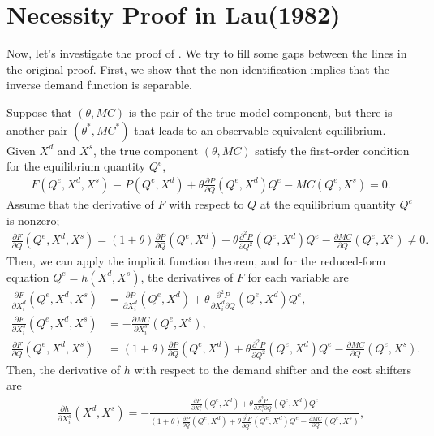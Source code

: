 \documentclass[11pt, a4paper]{article}
\theoremstyle{remark}
\begin{document}
\section{Necessity Proof in Lau(1982)}\label{sec:proof_lau_necessity}
Now, let's investigate the proof of \citet{lau1982identifying}.
We try to fill some gaps between the lines in the original proof.
First, we show that the non-identification implies that the inverse demand function is separable.

Suppose that $(\theta, MC)$ is the pair of the true model component, but there is another pair $(\theta^{*}, MC^{*})$ that leads to an observable equivalent equilibrium.
Given $X^{d}$ and $X^{s}$, the true component $(\theta, MC)$ satisfy the first-order condition for the equilibrium quantity $Q^e$,
\begin{align}
    F(Q^e, X^{d}, X^{s}) \equiv P(Q^e, X^{d}) + \theta\frac{\partial P}{\partial Q}(Q^e, X^{d})Q^e - MC(Q^e, X^{s}) = 0.
\end{align}
Assume that the derivative of $F$ with respect to $Q$ at the equilibrium quantity $Q^e$ is nonzero;
\begin{align}
    \frac{\partial F}{\partial Q}(Q^e, X^{d}, X^{s}) = (1+\theta)\frac{\partial P}{\partial Q}(Q^e, X^{d}) + \theta\frac{\partial^2 P}{\partial Q^2}(Q^e, X^{d})Q^e - \frac{\partial MC}{\partial Q}(Q^e, X^{s}) \ne 0.
\end{align}
Then, we can apply the implicit function theorem, and for the reduced-form equation $Q^e = h(X^{d}, X^{s})$, the derivatives of $F$ for each variable are
\begin{align}
    \frac{\partial F}{\partial X^{d}_i}(Q^e, X^{d}, X^{s}) & =  \frac{\partial P}{\partial X^{d}_{i}}(Q^e, X^{d}) + \theta\frac{\partial^2 P}{\partial X^{d}_{i}\partial Q}(Q^e, X^{d})Q^e,\\
    \frac{\partial F}{\partial X^{s}_i}(Q^e, X^{d}, X^{s}) & =  -\frac{\partial MC}{\partial X^{s}_{i}}(Q^e, X^{s}),\\
    \frac{\partial F}{\partial Q}(Q^e, X^{d}, X^{s}) & = (1+\theta)\frac{\partial P}{\partial Q}(Q^e, X^{d}) + \theta\frac{\partial^2 P}{\partial Q^2}(Q^e, X^{d})Q^e - \frac{\partial MC}{\partial Q}(Q^e, X^{s}).
\end{align}
Then, the derivative of $h$ with respect to the demand shifter and the cost shifters are
\begin{align}
    \frac{\partial h}{\partial X^{d}_{i}}(X^{d}, X^{s}) = -\frac{\frac{\partial P}{\partial X^{d}_{i}}(Q^e, X^{d}) + \theta\frac{\partial^2 P}{\partial X^{d}_{i}\partial Q}(Q^e, X^{d})Q^e }{(1+\theta)\frac{\partial P}{\partial Q}(Q^e, X^{d}) + \theta\frac{\partial^2 P}{\partial Q^2}(Q^e, X^{d})Q^e - \frac{\partial MC}{\partial Q}(Q^e, X^{s})}, \label{eq:foc_derivative_demand}
\end{align}
\end{document}

